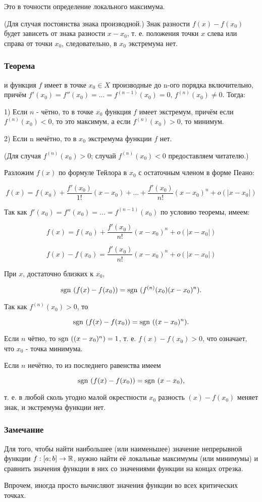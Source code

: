 Это в точности определение локального максимума.

\dokvo (Для случая постоянства знака производной.)
Знак разности $f(x)-f(x_0)$ будет зависеть от знака разности $x-x_0$, т. е. положения точки $x$ слева или справа от точки $x_0$, следовательно, в $x_0$ экстремума нет.

\dokno

\subsubsection{Теорема}
\fXR и функция $f$ имеет в точке $x_0\in X$ производные до n-ого порядка включительно, причём $f'(x_0)=f''(x_0)=...=f^{(n-1)}(x_0)=0$, $f^{(n)}(x_0) \neq 0$.
Тогда:

1) Если $n$ - чётно, то в точке $x_0$ функция $f$ имеет экстремум, причём если $f^{(n)}(x_0)<0$, то это максимум, а если $f^{(n)}(x_0)>0$, то минимум.

2) Если n нечётно, то в $x_0$ экстремума функции $f$ нет.

\dokvo (Для случая $f^{(n)}(x_0)>0$; случай $f^{(n)}(x_0)<0$ предоставляем читателю.)

Разложим $f(x)$ по формуле Тейлора в $x_0$ с остаточным членом в форме Пеано:

$$
f(x)=f(x_0)+\frac{f'(x_0)}{1!}(x-x_0)+...+\frac{f'(x_0)}{n!}(x-x_0)^n+o(|x-x_0|)
$$

Так как $f'(x_0)=f''(x_0)=...=f^{(n-1)}(x_0)$ по условию теоремы, имеем:

$$
f(x)=f(x_0)+\frac{f'(x_0)}{n!}(x-x_0)^n+o(|x-x_0|)
$$


$$
f(x)-f(x_0)=\frac{f'(x_0)}{n!}(x-x_0)^n+o(|x-x_0|)
$$

При $x$, достаточно близких к $x_0$,

$$
\mathrm{sgn}~(f(x)-f(x_0))=\mathrm{sgn}~(f^{(n)}(x_0)(x-x_0)^n).
$$

Так как $f^{(n)}(x_0)>0$, то

$$
\mathrm{sgn}~(f(x)-f(x_0))=\mathrm{sgn}~((x-x_0)^n).
$$

Если $n$ чётно, то $\mathrm{sgn}~((x-x_0)^n)=1$, т. е. $f(x)-f(x_0)>0$, что означает, что $x_0$ - точка минимума.

Если $n$ нечётно, то из последнего равенства имеем

$$
\mathrm{sgn}~(f(x)-f(x_0))=\mathrm{sgn}~(x-x_0),
$$

т. е. в любой сколь угодно малой окрестности $x_0$ разность $(x)-f(x_0)$ меняет знак, и экстремума функции нет.

\subsubsection{Замечание}

Для того, чтобы найти наибольшее (или наименьшее) значение непрерывной функции $f:[a;b] \to \mathbb{R}$, нужно найти её локальные максимумы (или минимумы) и сравнить значения функции в них со значениями функции на концах отрезка.

Впрочем, иногда просто вычисляют значения функции во всех критических точках.
